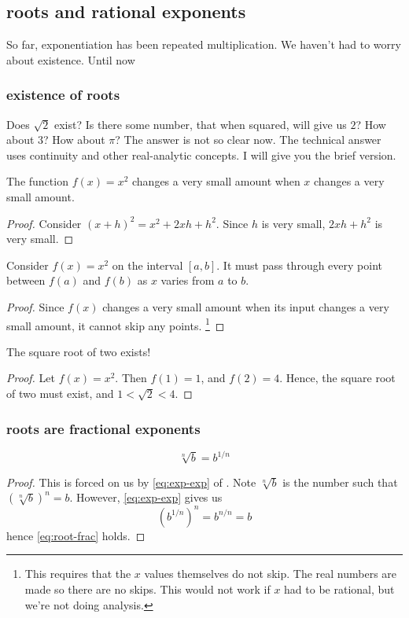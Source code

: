 \documentclass[10pt]{scrartcl}
\begin{document}
\subsection{roots and rational exponents}
So far, exponentiation has been repeated multiplication. We haven't had to worry about existence. Until now
\subsubsection{existence of roots}
Does $\sqrt{2}$ exist? Is there some number, that when squared, will give us $2$? How about $3$? How about $\pi$? The answer is not so clear now. The technical answer uses continuity and other real-analytic concepts. I will give you the brief version. 
\begin{lemma}
  The function $f(x)=x^2$ changes a very small amount when $x$ changes a very small amount. 
\end{lemma}
\begin{proof}
  Consider $(x+h)^2=x^2+2xh+h^2$. Since $h$ is very small, $2xh+h^2$ is very small. 
\end{proof}

\begin{cor}
  Consider $f(x)=x^2$ on the interval $[a,b]$. It must pass through every point between $f(a)$ and $f(b)$ as $x$ varies from $a$ to $b$.
\end{cor}
\begin{proof}
  Since $f(x)$ changes a very small amount when its input changes a very small amount,  it cannot skip any points. \footnote{This requires that the $x$ values themselves do not skip. The real numbers are made so there are no skips. This would not work if $x$ had to be rational, but we're not doing analysis.}
\end{proof}

\begin{theorem}
  The square root of two exists!
\end{theorem}
\begin{proof}
  Let $f(x)=x^2$. Then $f(1)=1$, and $f(2)=4$. Hence, the square root of two must exist, and $1<\sqrt 2 < 4$. 
\end{proof}

\subsubsection{roots are fractional exponents}
\begin{theorem}
  \begin{equation}
    \label{eq:root-frac}
    \sqrt[n]{b}=b^{1/n}
  \end{equation}
\end{theorem}
\begin{proof}
  This is forced on us by \cref{eq:exp-exp} of . Note $\sqrt[n]{b}$ is the number such that $(\sqrt[n]{b})^n=b$. However, \cref{eq:exp-exp} gives us 
  \[
  \left(b^{1/n}\right)^n=b^{n/n}=b
  \]
  hence \cref{eq:root-frac} holds. 
\end{proof}
\end{document}

